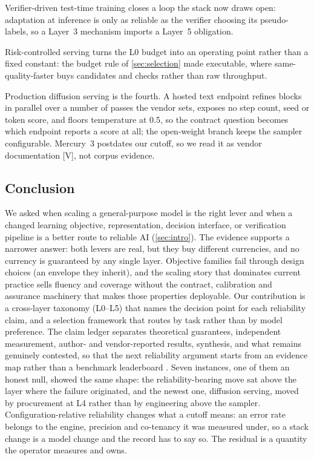 Verifier-driven test-time training \cite{id250519475} closes a loop the stack now draws open:
adaptation at inference is only as reliable as the verifier choosing its pseudo-labels, so a
Layer~3 mechanism imports a Layer~5 obligation.

Risk-controlled serving \cite{id260933887} turns the L0 budget into an operating point rather
than a fixed constant: the budget rule of \cref{sec:selection} made executable, where
same-quality-faster buys candidates and checks rather than raw throughput.

Production diffusion serving \cite{inception2026mercury3,llada2026two} is the fourth. A hosted
text endpoint refines blocks in parallel over a number of passes the vendor sets, exposes no
step count, seed or token score, and floors temperature at 0.5, so the contract question becomes
which endpoint reports a score at all; the open-weight branch keeps
the sampler configurable. Mercury~3 postdates our cutoff, so we read it as vendor documentation
[V], not corpus evidence.

\subsection{Conclusion}
We asked when scaling a general-purpose model is the right lever and when a changed learning
objective, representation, decision interface, or verification pipeline is a better route to
reliable AI (\cref{sec:intro}). The evidence supports a narrower answer: both levers are real,
but they buy different currencies, and no currency is guaranteed by any single layer. Objective
families fail through design choices (an envelope they inherit), and the scaling story
that dominates current practice sells fluency and coverage without the contract, calibration and
assurance machinery that makes those properties deployable. Our contribution is a cross-layer
taxonomy (L0--L5) that names the decision point for each reliability claim, and a selection
framework that routes by task rather than by model preference. The claim ledger separates
theoretical guarantees, independent measurement, author- and vendor-reported results, synthesis,
and what remains genuinely contested, so that the next reliability argument starts from an
evidence map rather than a benchmark leaderboard \cite{leaderillusion2025}. Seven instances, one
of them an honest null, showed the same shape: the reliability-bearing move sat above the layer
where the failure originated, and the newest one, diffusion serving, moved by procurement at L4
rather than by engineering above the sampler. Configuration-relative reliability changes what a
cutoff means: an error rate belongs to the engine, precision and co-tenancy it was measured
under, so a stack change is a model change and the record has to say so. The residual is a
quantity the operator measures and owns.
